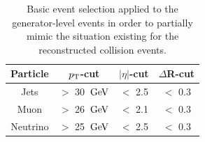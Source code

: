 \begin{table}[h!t]
 \centering
 \caption{Basic event selection applied to the generator-level events in order to partially mimic the situation existing for the reconstructed collision events.} \label{table::GenCuts}
 \begin{tabular}{c|c|c|c}
  Particle 	& $p_{\rm T}$-cut 		& $\vert \eta \vert$-cut 	& $\Delta$R-cut 	\\
  \hline
  Jets 		& $>$ 30 $\, \mathrm{GeV}$ 	& $<$ 2.5			& $<$ 0.3		\\
  Muon		& $>$ 26 $\, \mathrm{GeV}$		& $<$ 2.1			& $<$ 0.3		\\
  Neutrino 	& $>$ 25 $\, \mathrm{GeV}$		& $<$ 2.5			& $<$ 0.3		
 \end{tabular}
\end{table}

